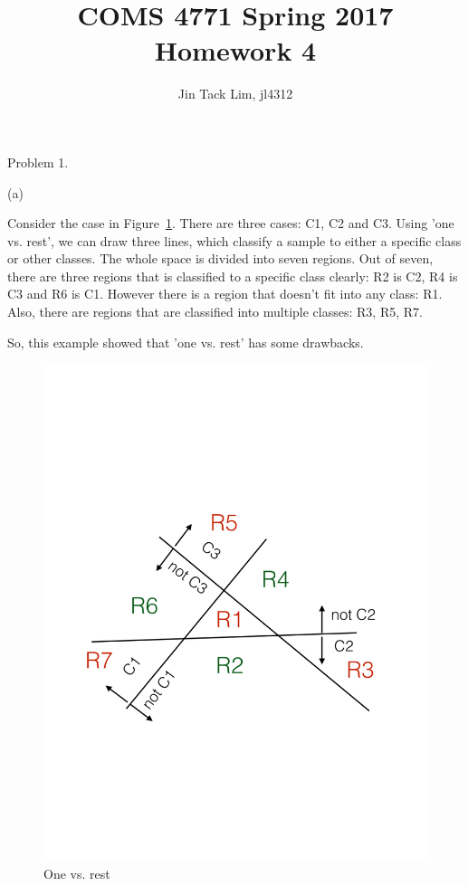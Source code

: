 \documentclass[11pt]{article}
\title{COMS 4771 Spring 2017 Homework 4}
\author{Jin Tack Lim, jl4312
  }
\date{%
  }
\theoremstyle{definition}
\begin{document}
\maketitle



Problem 1.

(a) 

Consider the case in Figure~\ref{fig:one-rest}. There are three cases: C1, C2 and C3. Using
'one vs. rest', we can draw three lines, which classify a sample to either a
specific class or other classes. The whole space is divided into seven regions.
Out of seven, there are three regions that is classified to a specific class
clearly: R2 is C2, R4 is C3 and R6 is C1.  However there is a region that
doesn't fit into any class: R1. Also, there are regions that are classified
into multiple classes: R3, R5, R7.

So, this example showed that 'one vs. rest' has some drawbacks.

\begin{figure}[h]
  \centering
  \includegraphics[width=\textwidth]{one-rest}
  \caption{One vs. rest}
  \label{fig:one-rest}
\end{figure}
\end{document}
